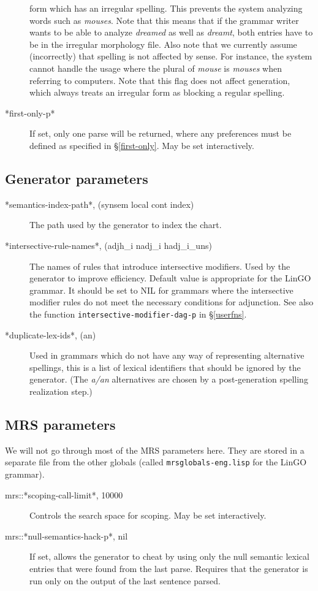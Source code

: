 \documentclass[12pt]{report}
\newcommand{\filename}[1]{{\tt #1}}
\newcommand{\functionname}[1]{{\tt #1}}
\begin{document}
\begin{description}
form which has an irregular spelling.  This prevents the system
analyzing words such as {\it mouses}.  Note that this means
that if the grammar writer wants to be able to analyze {\it dreamed} as
well as {\it dreamt}, both entries have to be in the irregular morphology
file.  Also note that we currently assume (incorrectly) that spelling is
not affected by sense. For instance, the system cannot handle
the usage where the plural
of {\it mouse} is {\it mouses} when referring to computers.
Note that this flag does not affect generation, which
always treats an irregular form as blocking a regular spelling.
\item[*first-only-p*] If set, only one parse will be returned,
where any preferences must be defined as specified
in \S\ref{first-only}.  May be set interactively.
\end{description}

\subsection{Generator parameters}
\label{genglob}

\begin{description}
\item[*semantics-index-path*, (synsem local cont index)]
The path used by the generator to index the chart.
\item[*intersective-rule-names*, (adjh\_i nadj\_i hadj\_i\_uns)]
The names of rules that introduce intersective modifiers.
Used by the generator to improve efficiency.
Default value is appropriate for the LinGO grammar.
It should be set to NIL for grammars where the intersective modifier
rules do not meet the necessary conditions for adjunction.
See also the function
\functionname{intersective-modifier-dag-p} in \S\ref{userfns}.
\item[*duplicate-lex-ids*, (an)]
Used in grammars which do not
have any way of representing alternative spellings, this is a list
of lexical identifiers that should be ignored by the generator.
(The {\it a/an} alternatives are chosen by a post-generation spelling
realization step.)
\end{description}

\subsection{MRS parameters}
\label{mrsglob}

We will not go through most of the MRS parameters here.  They are
stored in a separate file from the other globals (called 
\filename{mrsglobals-eng.lisp} for the LinGO grammar).
\begin{description}
\item[mrs::*scoping-call-limit*, 10000]  
Controls the search space for scoping.  
May be set interactively.
\item[mrs::*null-semantics-hack-p*, nil]
If set, allows the generator to cheat by using only the null semantic lexical
entries that were found from the last parse.  Requires that the generator is
run only on the output of the last sentence parsed.
\end{description}
\end{document}
